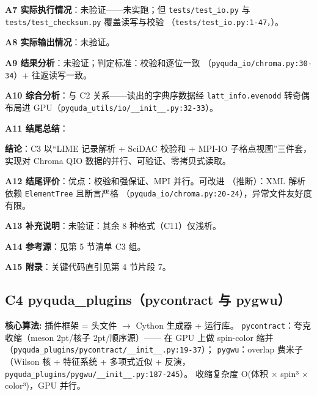 \documentclass[UTF8]{ctexart}
\begin{document}
\textbf{A7 实际执行情况}：\textcolor{warn}{未验证}——未实跑；但
\texttt{tests/test\_io.py} 与 \texttt{tests/test\_checksum.py} 覆盖读写与校验
（\texttt{\nolinkurl{tests/test_io.py:1-47}，}）。

\textbf{A8 实际输出情况}：\textcolor{warn}{未验证}。

\textbf{A9 结果分析}：\textcolor{warn}{未验证}；判定标准：校验和逐位一致
（\texttt{\nolinkurl{pyquda_io/chroma.py:30-34}}）+ 往返读写一致。

\textbf{A10 综合分析}：与 C2 关系——读出的字典序数据经
\texttt{latt\_info.evenodd} 转奇偶布局进 GPU（\texttt{\nolinkurl{pyquda_utils/io/__init__.py:32-33}}）。

\textbf{A11 结尾总结}：
\begin{conclbox}
\textbf{结论}：C3 以“LIME 记录解析 + SciDAC 校验和 + MPI-IO 子格点视图”三件套，
实现对 Chroma QIO 数据的并行、可验证、零拷贝式读取。
\end{conclbox}

\textbf{A12 结尾评价}：优点：校验和强保证、MPI 并行。可改进
（\textcolor{phys}{推断}）：XML 解析依赖 \texttt{ElementTree} 且断言严格
（\texttt{\nolinkurl{pyquda_io/chroma.py:20-24}}），异常文件友好度有限。

\textbf{A13 补充说明}：\textcolor{warn}{未验证}：其余 8 种格式（C11）仅浅析。

\textbf{A14 参考源}：见第 5 节清单 C3 组。

\textbf{A15 附录}：关键代码直引见第 4 节片段 7。

\subsection{C4 pyquda\_plugins（pycontract 与 pygwu）}

\begin{algobox}
\textbf{核心算法:} 插件框架 = 头文件 $\rightarrow$ Cython 生成器 + 运行库。
\texttt{pycontract}：夸克收缩（meson 2pt/核子 2pt/顺序源）——
在 GPU 上做 spin-color 缩并（\texttt{\nolinkurl{pyquda_plugins/pycontract/__init__.py:19-37}}）；
\texttt{pygwu}：overlap 费米子（Wilson 核 + 特征系统 + 多项式近似 + 反演，
\texttt{\nolinkurl{pyquda_plugins/pygwu/__init__.py:187-245}}）。
收缩复杂度 O(体积 × spin³ × color³)，GPU 并行。
\end{algobox}
\end{document}
